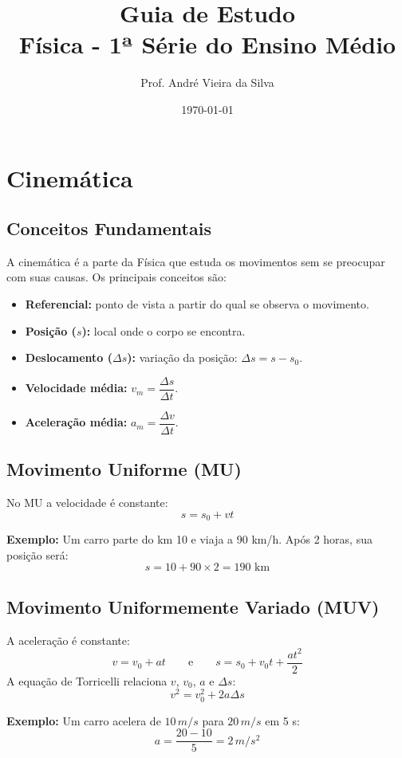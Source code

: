 \documentclass[a4paper,12pt]{article}
\title{\textbf{Guia de Estudo \\Física - 1ª Série do Ensino Médio}}
\author{Prof. André Vieira da Silva}
\date{}
\date{\today}
\begin{document}
\maketitle
\tableofcontents
\newpage

\section{Cinemática}

\subsection{Conceitos Fundamentais}
A cinemática é a parte da Física que estuda os movimentos sem se preocupar com suas causas.  
Os principais conceitos são:

\begin{itemize}
    \item \textbf{Referencial:} ponto de vista a partir do qual se observa o movimento.
    \item \textbf{Posição ($s$):} local onde o corpo se encontra.
    \item \textbf{Deslocamento ($\Delta s$):} variação da posição: $\Delta s = s - s_0$.
    \item \textbf{Velocidade média:} $v_m = \dfrac{\Delta s}{\Delta t}$.
    \item \textbf{Aceleração média:} $a_m = \dfrac{\Delta v}{\Delta t}$.
\end{itemize}

\subsection{Movimento Uniforme (MU)}
No MU a velocidade é constante:
\[
s = s_0 + vt
\]

\textbf{Exemplo:} Um carro parte do km 10 e viaja a 90 km/h.  
Após 2 horas, sua posição será:
\[
s = 10 + 90 \times 2 = 190 \text{ km}
\]

\subsection{Movimento Uniformemente Variado (MUV)}
A aceleração é constante:
\[
v = v_0 + at \qquad \text{e} \qquad s = s_0 + v_0t + \frac{at^2}{2}
\]
A equação de Torricelli relaciona $v$, $v_0$, $a$ e $\Delta s$:
\[
v^2 = v_0^2 + 2a\Delta s
\]

\textbf{Exemplo:} Um carro acelera de $10\,m/s$ para $20\,m/s$ em 5 s:
\[
a = \frac{20 - 10}{5} = 2\,m/s^2
\]
\end{document}

